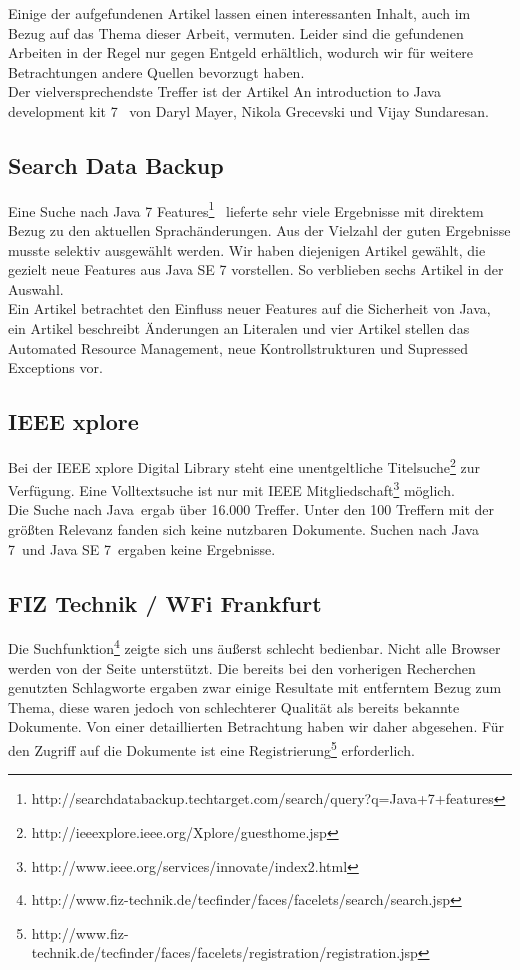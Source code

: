 Einige der aufgefundenen Artikel lassen einen interessanten Inhalt, auch im Bezug auf das Thema dieser Arbeit, vermuten. Leider sind die gefundenen Arbeiten in der Regel nur gegen Entgeld erhältlich, wodurch wir für weitere Betrachtungen andere Quellen bevorzugt haben.\\

Der vielversprechendste Treffer ist der Artikel \glqq An introduction to Java development kit 7 \grqq\cite{acmJava7} ~von Daryl Mayer, Nikola Grecevski und Vijay Sundaresan.

\subsection{Search Data Backup}
Eine Suche nach \glqq Java 7 Features\grqq\footnote{http://searchdatabackup.techtarget.com/search/query?q=Java+7+features} ~lieferte sehr viele Ergebnisse mit direktem Bezug zu den aktuellen Sprachänderungen. Aus der Vielzahl der guten Ergebnisse musste selektiv ausgewählt werden. Wir haben diejenigen Artikel gewählt, die gezielt neue Features aus Java SE 7 vorstellen. So verblieben sechs Artikel in der Auswahl.\\

Ein Artikel\cite{sbJ7ImproveSec} betrachtet den Einfluss neuer Features auf die Sicherheit von Java, ein Artikel\cite{sbJ7literals} beschreibt Änderungen an Literalen und vier Artikel stellen das Automated Resource Management\cite{sbJ7resources}\cite{sbJ7coin}, neue Kontrollstrukturen\cite{sbJ7switch} und Supressed Exceptions\cite{sbJ7exeptions} vor.

\subsection{IEEE xplore}
Bei der IEEE xplore Digital Library steht eine unentgeltliche Titelsuche\footnote{http://ieeexplore.ieee.org/Xplore/guesthome.jsp} zur Verfügung. Eine Volltextsuche ist nur mit IEEE Mitgliedschaft\footnote{http://www.ieee.org/services/innovate/index2.html} möglich.\\

Die Suche nach \glqq Java\grqq ~ergab über 16.000 Treffer. Unter den 100 Treffern mit der größten Relevanz fanden sich keine nutzbaren Dokumente. Suchen nach \glqq Java 7\grqq ~und \glqq Java SE 7\grqq ~ergaben keine Ergebnisse.

\subsection{FIZ Technik / WFi Frankfurt}
Die Suchfunktion\footnote{http://www.fiz-technik.de/tecfinder/faces/facelets/search/search.jsp} zeigte sich uns äußerst schlecht bedienbar. Nicht alle Browser werden von der Seite unterstützt. Die bereits bei den vorherigen Recherchen genutzten Schlagworte ergaben zwar einige Resultate mit entferntem Bezug zum Thema, diese waren jedoch von schlechterer Qualität als bereits bekannte Dokumente. Von einer detaillierten Betrachtung haben wir daher abgesehen.
Für den Zugriff auf die Dokumente ist eine Registrierung\footnote{http://www.fiz-technik.de/tecfinder/faces/facelets/registration/registration.jsp} erforderlich.

